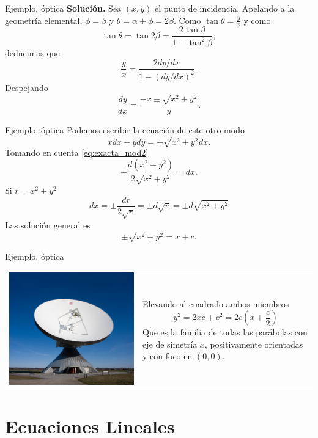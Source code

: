 \documentclass{article}
\begin{document}
{Ejemplo, óptica}
 \textbf{Solución.} Sea $(x,y)$ el punto de incidencia. Apelando a la geometría elemental, $\phi=\beta$ y $\theta=\alpha+\phi=2\beta$. Como $\tan\theta=\frac{y}{x}$
  y como
  \[\tan\theta =\tan 2\beta=\frac{2\tan\beta}{1-\tan^2\beta},\]
deducimos que
\[\frac{y}{x}=\frac{2 dy/dx}{1-(dy/dx)^2}.\]
Despejando
\[\frac{dy}{dx} =\frac{-x\pm\sqrt{x^2+y^2}}{y}.\]




{Ejemplo, óptica}
Podemos escribir la ecuación de este otro modo
\[xdx+ydy=\pm\sqrt{x^2+y^2}dx.\]
Tomando en cuenta \eqref{eq:exacta_mod2}
\[\pm\frac{d(x^2+y^2)}{2\sqrt{x^2+y^2}}=dx.\]
Si $r=x^2+y^2$
\[dx=\pm\frac{dr}{2\sqrt{r}}=\pm d\sqrt{r}=\pm d\sqrt{x^2+y^2}\]
Las solución general es
\[\pm\sqrt{x^2+y^2}=x+c.\]
 





{Ejemplo, óptica}
 \begin{tabular}{m{4cm} m{5cm}}
 \includegraphics[scale=.15]{imagenes/antena.jpg} & Elevando al cuadrado ambos miembros
\[y^2=2xc+c^2=2c\left(x+\frac{c}{2}\right)\]
Que es la familia de todas las parábolas con eje de simetría $x$, positivamente orientadas y con foco en $(0,0)$. \\
 \end{tabular}
 
\section[Lineales]{Ecuaciones Lineales}
\end{document}
